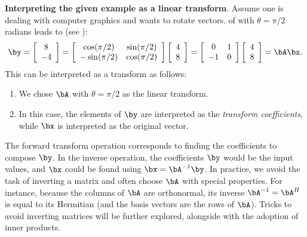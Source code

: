 \bExample \textbf{Interpreting the given example as a linear transform}.
Assume one is dealing with computer graphics and wants to rotate vectors.  of  with $\theta=\pi/2$ radians leads to (see ):
\[
\by = \left[ \begin{array}{c}
8 \\
-4
 \\ \end{array} \right] =
\left[ \begin{array}{cc}
\cos(\pi/2) & \sin(\pi/2)\\
-\sin(\pi/2) & \cos(\pi/2)
 \\ \end{array} \right] \left[ \begin{array}{c}
4 \\
8
 \\ \end{array} \right] = 
\left[ \begin{array}{cc}
0 & 1\\
-1 & 0
 \\ \end{array} \right] \left[ \begin{array}{c}
4 \\
8
 \\ \end{array} \right] =
\bA \bx.
\]
This can be interpreted as a transform as follows:
\begin{enumerate}
	\item We chose $\bA$ with $\theta=\pi/2$ as the linear transform.
	\item In this case, the elements of $\by$ are interpreted as the \emph{transform coefficients},
	while $\bx$ is interpreted as the original vector.
\end{enumerate}
The forward transform operation corresponds to finding the coefficients to compose $\by$. In the inverse operation,
the coefficients $\by$ would be the input values, and $\bx$ could be found using $\bx = \bA^{-1} \by$. In practice, we avoid
the task of inverting a matrix and often choose $\bA$ with special properties.
For instance, because the columns of $\bA$ are orthonormal, its inverse $\bA^{-1} = \bA^H$ is equal to its Hermitian
(and the basis vectors are the rows of $\bA$).
Tricks to avoid inverting matrices will be further explored, alongside with the adoption of inner products.
\eExample



